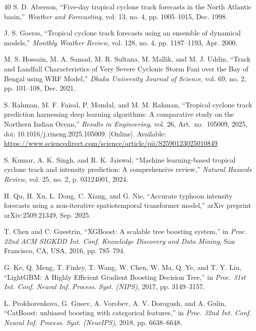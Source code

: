 \documentclass[10pt,twocolumn,a4paper]{article}
\begin{document}
\begin{thebibliography}{40}
S. D. Aberson, ``Five-day tropical cyclone track forecasts in the North Atlantic basin,'' \textit{Weather and Forecasting}, vol. 13, no. 4, pp. 1005--1015, Dec. 1998.

J. S. Goerss, ``Tropical cyclone track forecasts using an ensemble of dynamical models,'' \textit{Monthly Weather Review}, vol. 128, no. 4, pp. 1187--1193, Apr. 2000.

M. S. Hossain, M. A. Samad, M. R. Sultana, M. Mallik, and M. J. Uddin, ``Track and Landfall Characteristics of Very Severe Cyclonic Storm Fani over the Bay of Bengal using WRF Model,'' \textit{Dhaka University Journal of Science}, vol. 69, no. 2, pp. 101--108, Dec. 2021.

S. Rahman, M. F. Faisal, P. Mondal, and M. M. Rahman, ``Tropical cyclone track prediction harnessing deep learning algorithms: A comparative study on the Northern Indian Ocean,'' \textit{Results in Engineering}, vol. 26, Art.\ no.\ 105009, 2025, doi: 10.1016/j.rineng.2025.105009. [Online]. Available: \url{https://www.sciencedirect.com/science/article/pii/S2590123025010849}

S. Kumar, A. K. Singh, and R. K. Jaiswal, ``Machine learning-based tropical cyclone track and intensity prediction: A comprehensive review,'' \textit{Natural Hazards Review}, vol. 25, no. 2, p. 03124001, 2024.

H. Qu, H. Xu, L. Dong, C. Xiang, and G. Nie, ``Accurate typhoon intensity forecasts using a non-iterative spatiotemporal transformer model,'' arXiv preprint arXiv:2509.21349, Sep. 2025.

T. Chen and C. Guestrin, ``XGBoost: A scalable tree boosting system,'' in \textit{Proc. 22nd ACM SIGKDD Int. Conf. Knowledge Discovery and Data Mining}, San Francisco, CA, USA, 2016, pp. 785--794.

G. Ke, Q. Meng, T. Finley, T. Wang, W. Chen, W. Ma, Q. Ye, and T. Y. Liu, ``LightGBM: A Highly Efficient Gradient Boosting Decision Tree,'' in \textit{Proc. 31st Int. Conf. Neural Inf. Process. Syst. (NIPS)}, 2017, pp. 3149--3157.

L. Prokhorenkova, G. Gusev, A. Vorobev, A. V. Dorogush, and A. Gulin, ``CatBoost: unbiased boosting with categorical features,'' in \textit{Proc. 32nd Int. Conf. Neural Inf. Process. Syst. (NeurIPS)}, 2018, pp. 6638--6648.


\end{thebibliography}
\end{document}
